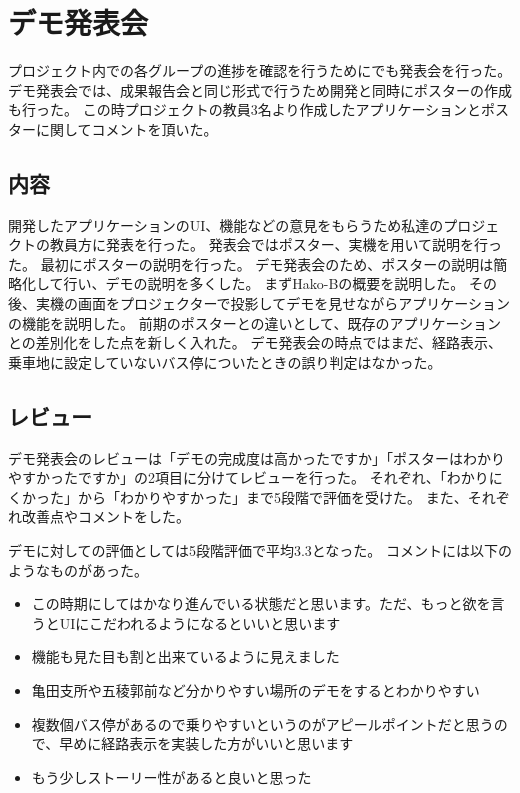 \documentclass[openany,11pt,papersize]{jsbook}
\begin{document}

\section{デモ発表会}
プロジェクト内での各グループの進捗を確認を行うためにでも発表会を行った。
デモ発表会では、成果報告会と同じ形式で行うため開発と同時にポスターの作成も行った。
この時プロジェクトの教員3名より作成したアプリケーションとポスターに関してコメントを頂いた。


\subsection{内容}
開発したアプリケーションのUI、機能などの意見をもらうため私達のプロジェクトの教員方に発表を行った。
発表会ではポスター、実機を用いて説明を行った。
最初にポスターの説明を行った。
デモ発表会のため、ポスターの説明は簡略化して行い、デモの説明を多くした。
まずHako-Bの概要を説明した。
その後、実機の画面をプロジェクターで投影してデモを見せながらアプリケーションの機能を説明した。
前期のポスターとの違いとして、既存のアプリケーションとの差別化をした点を新しく入れた。
デモ発表会の時点ではまだ、経路表示、乗車地に設定していないバス停についたときの誤り判定はなかった。


\subsection{レビュー}
デモ発表会のレビューは「デモの完成度は高かったですか」「ポスターはわかりやすかったですか」の2項目に分けてレビューを行った。
それぞれ、「わかりにくかった」から「わかりやすかった」まで5段階で評価を受けた。
また、それぞれ改善点やコメントをした。

デモに対しての評価としては5段階評価で平均3.3となった。
コメントには以下のようなものがあった。
\begin{itemize}

\item この時期にしてはかなり進んでいる状態だと思います。ただ、もっと欲を言うとUIにこだわれるようになるといいと思います
\item 機能も見た目も割と出来ているように見えました
\item 亀田支所や五稜郭前など分かりやすい場所のデモをするとわかりやすい
\item 複数個バス停があるので乗りやすいというのがアピールポイントだと思うので、早めに経路表示を実装した方がいいと思います
\item もう少しストーリー性があると良いと思った

\end{itemize}
\end{document}
